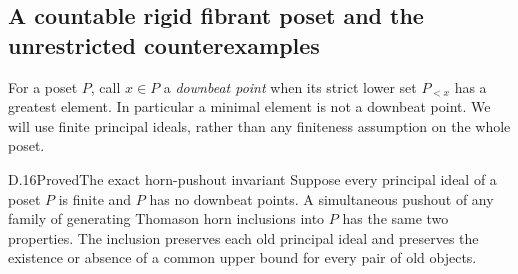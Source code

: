 \subsection{A countable rigid fibrant poset and the unrestricted counterexamples}

For a poset $P$, call $x\in P$ a \emph{downbeat point} when its strict lower set $P_{<x}$ has a greatest element. In particular a minimal element is not a downbeat point. We will use finite principal ideals, rather than any finiteness assumption on the whole poset.

\begin{claim}{D.16}{Proved}{The exact horn-pushout invariant}
Suppose every principal ideal of a poset $P$ is finite and $P$ has no downbeat points. A simultaneous pushout of any family of generating Thomason horn inclusions into $P$ has the same two properties. The inclusion preserves each old principal ideal and preserves the existence or absence of a common upper bound for every pair of old objects.
\end{claim}
